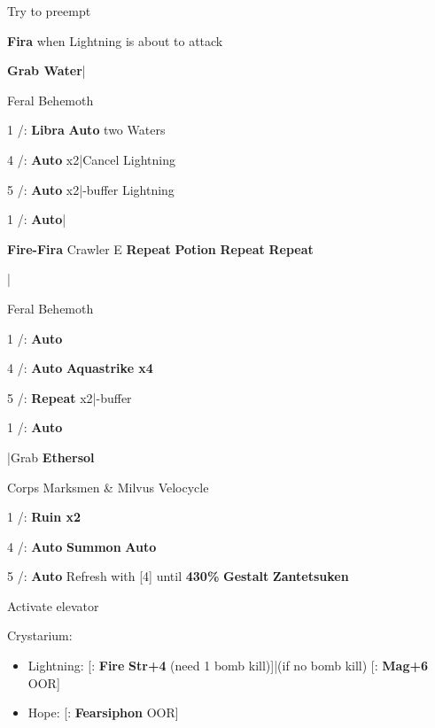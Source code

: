 \begin{mainlist}
	\item Try to preempt
	\item {} \textbf{Fira} when Lightning is about to attack
	\item \textbf{Grab Water}|\skip
\end{mainlist}
\begin{fight}{Feral Behemoth}
	\item [1] \rav/\com: \textbf{Libra} \to \textbf{Auto} two Waters
	\item [4] \rav/\rav: \textbf{Auto} x2|Cancel Lightning
	\item [5] \rav/\rav: \textbf{Auto} x2|\com-buffer Lightning
	\item [1] \rav/\com: \textbf{Auto}|\skip
\end{fight}
\begin{mainlist}
	\item {} \textbf{Fire-Fira} Crawler E \to [6] \textbf{Repeat} \to \textbf{\textbf{Potion}} \to \textbf{Repeat} \to [1] \textbf{Repeat}
	\item {}|
\end{mainlist}
\begin{fight}{Feral Behemoth}
	\item [1] \com/\rav: \textbf{Auto}
	\item [4] \rav/\rav: \textbf{Auto} \to \textbf{Aquastrike x4}
	\item [5] \rav/\rav: \textbf{Repeat} x2|\com-buffer
	\item [1] \com/\rav: \textbf{Auto}
\end{fight}
\begin{mainlist}
	\item \skip|Grab \textbf{Ethersol}
\end{mainlist}
\begin{fight}{Corps Marksmen \& Milvus Velocycle}
	\item [1] \com/\rav: \textbf{Ruin x2}
	\item [4] \rav/\rav: \textbf{Auto} \to \textbf{Summon} \to \textbf{Auto}
	\item [5] \rav/\rav: \textbf{Auto} \to Refresh with [4] until \textbf{430\%} \to \textbf{Gestalt} \to \textbf{Zantetsuken}
	\item Activate elevator
\end{fight}
\begin{menu}
	\item Crystarium:
	\begin{itemize}
		\item Lightning: [\rav: \textbf{Fire} \to \textbf{Str+4} (need 1 bomb kill)]|(if no bomb kill) [\com: \textbf{Mag+6} OOR]
		\item Hope: [\rav: \textbf{Fearsiphon} OOR]
	\end{itemize}
\end{menu}
